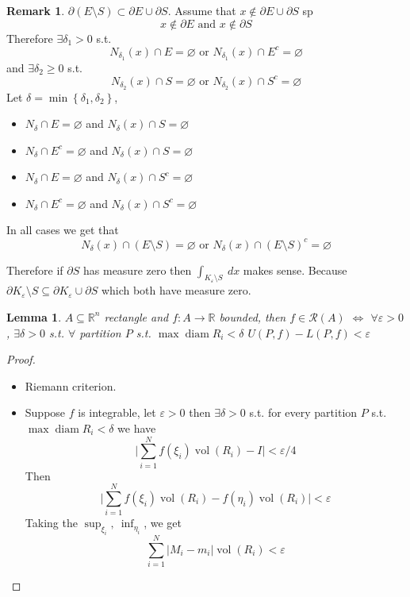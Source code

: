 \documentclass[11pt,a4paper]{article}
\theoremstyle{definition}
\newtheorem{remark}[definition]{Remark}
\theoremstyle{plain}
\newtheorem{lemma}[definition]{Lemma}
\theoremstyle{remark}
\newcommand{\R}{\mathbb{R}}
\renewcommand{\set}[1]{\left\{ #1 \right\}}
\newcommand{\abs}[1]{\lvert #1 \rvert}
\newcommand{\vol}{\operatorname{vol}}
\begin{document}
\begin{remark}
    $\partial (E \setminus S) \subset \partial E \cup \partial S$. Assume that $x \not\in \partial E \cup \partial S$ sp 
    $$x \not\in \partial E \text{ and } x \not\in \partial S$$
    Therefore $\exists \delta_1 > 0$ s.t. 
    $$N_{\delta_1}(x) \cap E = \varnothing \text{ or } N_{\delta_1} (x) \cap E^c = \varnothing$$
    and $\exists \delta_2 \ge 0$ s.t. 
    $$N_{\delta_2} (x) \cap S = \varnothing \text{ or } N_{\delta_2} (x) \cap S^c = \varnothing$$
    Let $\delta = \min \set{\delta_1, \delta_2}$, 
    \begin{itemize}
        \item $N_\delta \cap E = \varnothing$ and $N_\delta(x) \cap S = \varnothing$
    
        \item $N_\delta \cap E^c = \varnothing$ and $N_\delta(x) \cap S = \varnothing$
        \item $N_\delta \cap E = \varnothing$ and $N_\delta(x) \cap S^c = \varnothing$
        
        \item $N_\delta \cap E^c = \varnothing$ and $N_\delta(x) \cap S^c = \varnothing$
    \end{itemize}
    In all cases we get that 
    $$N_\delta(x) \cap (E \setminus S) = \varnothing \text{ or } N_\delta(x) \cap (E \setminus S)^c = \varnothing$$

    Therefore if $\partial S$ has measure zero then $\int_{K_\varepsilon \setminus S} \ dx$ makes sense. 
    Because $\partial K_\varepsilon \setminus S \subseteq \partial K_\varepsilon \cup \partial S$ which both have measure zero.
\end{remark}

\begin{lemma}
    $A \subseteq \R^n$ rectangle and $f \colon A \to \R$ bounded, then $f \in \mathcal{R}(A)$ $\iff$ $\forall \varepsilon > 0$, $\exists \delta > 0$ s.t. 
    $\forall$ partition $P$ s.t. $\max \operatorname{diam} R_i < \delta$ $U(P,f) - L(P,f) < \varepsilon$
\end{lemma}

\begin{proof}
    \begin{itemize}
        \item[$\impliedby$] Riemann criterion. 
        \item[$\implies$] Suppose $f$ is integrable, let $\varepsilon > 0$ then $\exists \delta > 0$ s.t. for every partition 
        $P$ s.t. $\max \operatorname{diam} R_i < \delta$ we have 
        $$\abs{\sum_{i=1}^N f(\xi_i) \vol (R_i) - I} < \varepsilon/4$$
        Then 
        $$\abs{\sum_{i=1}^N f(\xi_i) \vol (R_i) - f(\eta_i) \vol (R_i)} < \varepsilon$$
        Taking the $\sup_{\xi_i}, \ \inf_{\eta_i}$, we get 
        $$\sum_{i=1}^N \abs{M_i - m_i} \vol (R_i) < \varepsilon$$
    \end{itemize}
\end{proof}
\end{document}
